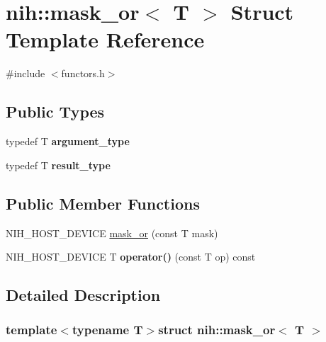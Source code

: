 \hypertarget{structnih_1_1mask__or}{
\section{nih\-:\-:mask\-\_\-or$<$ \-T $>$ \-Struct \-Template \-Reference}
\label{structnih_1_1mask__or}
}


{\ttfamily \#include $<$functors.\-h$>$}

\subsection*{\-Public \-Types}
\begin{DoxyCompactItemize}
\item 
\hypertarget{structnih_1_1mask__or_a2dc8c0dd54ec85bb3af5df164ba6f768}{
typedef \-T {\bfseries argument\-\_\-type}}
\label{structnih_1_1mask__or_a2dc8c0dd54ec85bb3af5df164ba6f768}

\item 
\hypertarget{structnih_1_1mask__or_abe219838de68628b497520958fdbcce5}{
typedef \-T {\bfseries result\-\_\-type}}
\label{structnih_1_1mask__or_abe219838de68628b497520958fdbcce5}

\end{DoxyCompactItemize}
\subsection*{\-Public \-Member \-Functions}
\begin{DoxyCompactItemize}
\item 
\-N\-I\-H\-\_\-\-H\-O\-S\-T\-\_\-\-D\-E\-V\-I\-C\-E \hyperlink{structnih_1_1mask__or_a5b88655e50c7a378cc8575d84b92b92b}{mask\-\_\-or} (const \-T mask)
\item 
\hypertarget{structnih_1_1mask__or_a8d18a33e86c7bdf21c6cb9c3fb157ef6}{
\-N\-I\-H\-\_\-\-H\-O\-S\-T\-\_\-\-D\-E\-V\-I\-C\-E \-T {\bfseries operator()} (const \-T op) const }
\label{structnih_1_1mask__or_a8d18a33e86c7bdf21c6cb9c3fb157ef6}

\end{DoxyCompactItemize}


\subsection{\-Detailed \-Description}
\subsubsection*{template$<$typename T$>$struct nih\-::mask\-\_\-or$<$ T $>$}

